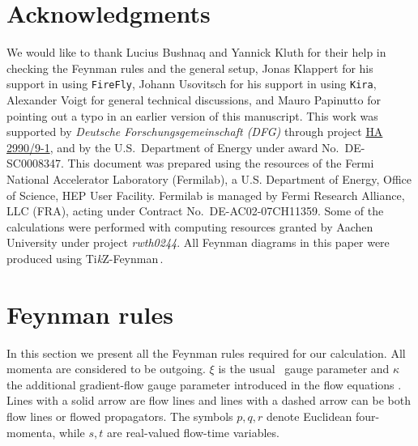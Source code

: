 \section*{Acknowledgments}

We would like to thank Lucius Bushnaq and Yannick Kluth for their help
in checking the Feynman rules and the general setup, Jonas Klappert for
his support in using \texttt{FireFly}, Johann Usovitsch for his support
in using \texttt{Kira}, Alexander Voigt for general technical
discussions, and Mauro Papinutto for pointing out a typo in an earlier
version of this manuscript.  This work was supported by \textit{Deutsche
  Forschungsgemeinschaft (DFG)} through project
\href{http://gepris.dfg.de/gepris/projekt/386986591}{HA 2990/9-1}, and
by the U.S.\ Department of Energy under award No.\ DE-SC0008347.  This
document was prepared using the resources of the Fermi National
Accelerator Laboratory (Fermilab), a U.S. Department of Energy, Office
of Science, HEP User Facility. Fermilab is managed by Fermi Research
Alliance, LLC (FRA), acting under Contract No.\ DE-AC02-07CH11359.  Some
of the calculations were performed with computing resources granted by
 Aachen University under project \textit{rwth0244}.  All
Feynman diagrams in this paper were produced using
Ti\textit{k}Z-Feynman\,\cite{Ellis:2016jkw}.



\appendix

\section{Feynman rules}
\label{sec:frules}

In this section we present all the Feynman rules required for our
calculation.  All momenta are considered to be outgoing.  $\xi$ is the
usual \qcd\ gauge parameter and $\kappa$ the additional gradient-flow
gauge parameter introduced in the flow equations .  Lines
with a solid arrow are flow lines and lines with a dashed arrow can be
both flow lines or flowed propagators. The symbols $p,q,r$ denote
Euclidean four-momenta, while $s,t$ are real-valued flow-time variables.

